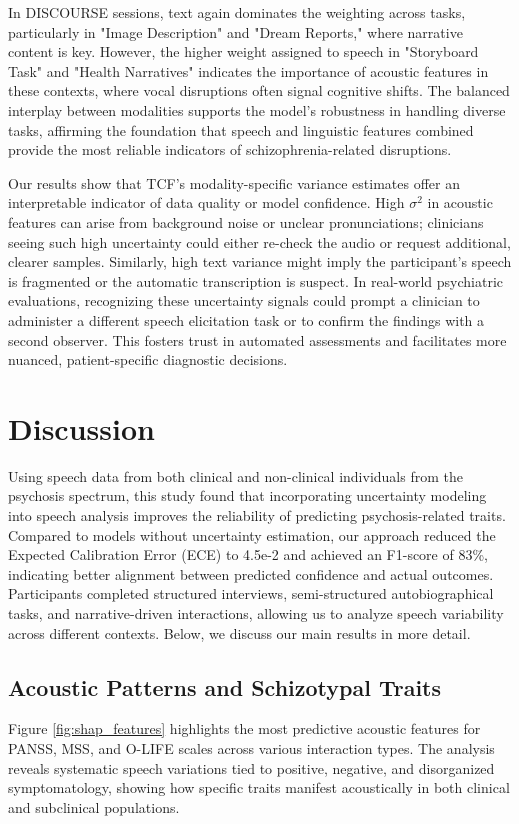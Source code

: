 \documentclass[9pt,a4paper]{rho-class/rho}
\begin{document}
In DISCOURSE sessions, text again dominates the weighting across tasks, particularly in "Image Description" and "Dream Reports," where narrative content is key. However, the higher weight assigned to speech in "Storyboard Task" and "Health Narratives" indicates the importance of acoustic features in these contexts, where vocal disruptions often signal cognitive shifts. The balanced interplay between modalities supports the model's robustness in handling diverse tasks, affirming the foundation that speech and linguistic features combined provide the most reliable indicators of schizophrenia-related disruptions.


Our results show that TCF’s modality-specific variance estimates offer 
an interpretable indicator of data quality or model confidence. High $\sigma^2$ 
in acoustic features can arise from background noise or unclear pronunciations; 
clinicians seeing such high uncertainty could either re-check the audio or 
request additional, clearer samples. Similarly, high text variance might imply 
the participant’s speech is fragmented or the automatic transcription is suspect. 
In real-world psychiatric evaluations, recognizing these uncertainty signals 
could prompt a clinician to administer a different speech elicitation task 
or to confirm the findings with a second observer. This fosters 
trust in automated assessments and facilitates more nuanced, patient-specific 
diagnostic decisions.


\section{Discussion}
Using speech data from both clinical and non-clinical individuals from the psychosis spectrum, this study found that incorporating uncertainty modeling into speech analysis improves the reliability of predicting psychosis-related traits. Compared to models without uncertainty estimation, our approach reduced the Expected Calibration Error (ECE) to 4.5e-2 and achieved an F1-score of 83\%, indicating better alignment between predicted confidence and actual outcomes. Participants completed structured interviews, semi-structured autobiographical tasks, and narrative-driven interactions, allowing us to analyze speech variability across different contexts. Below, we discuss our main results in more detail.

\subsection{Acoustic Patterns and Schizotypal Traits}
 Figure \ref{fig:shap_features} highlights the most predictive acoustic features for PANSS, MSS, and O-LIFE scales across various interaction types. The analysis reveals systematic speech variations tied to positive, negative, and disorganized symptomatology, showing how specific traits manifest acoustically in both clinical and subclinical populations.
 
\end{document}
